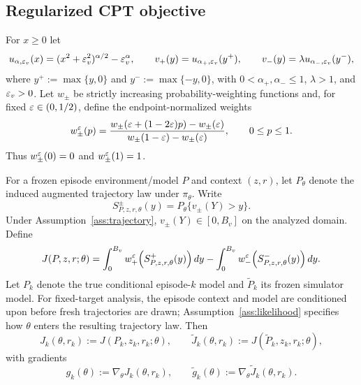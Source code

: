\subsection{Regularized CPT objective}

For $x\ge0$ let
\begin{equation}\label{eq:value-functions}
 u_{\alpha,\varepsilon_v}(x)=(x^2+\varepsilon_v^2)^{\alpha/2}-\varepsilon_v^\alpha,
 \qquad
 v_+(y)=u_{\alpha_+,\varepsilon_v}(y^+),
 \qquad
 v_-(y)=\lambda u_{\alpha_-,\varepsilon_v}(y^-),
\end{equation}
where $y^+:=\max\{y,0\}$ and $y^-:=\max\{-y,0\}$, with $0<\alpha_+,\alpha_-\le1$, $\lambda>1$, and $\varepsilon_v>0$.  Let $w_\pm$ be strictly increasing probability-weighting functions and, for fixed $\varepsilon\in(0,1/2)$, define the endpoint-normalized weights
\begin{equation}\label{eq:normalized-weight}
 w_\pm^\varepsilon(p)
 =\frac{w_\pm(\varepsilon+(1-2\varepsilon)p)-w_\pm(\varepsilon)}
 {w_\pm(1-\varepsilon)-w_\pm(\varepsilon)},
 \qquad 0\le p\le1.
\end{equation}
Thus $w_\pm^\varepsilon(0)=0$ and $w_\pm^\varepsilon(1)=1$.

For a frozen episode environment/model $P$ and context $(z,r)$, let $P_\theta$ denote the induced augmented trajectory law under $\pi_\theta$.  Write
\[
 S_{P,z,r,\theta}^{\pm}(y)
 =P_\theta\{v_\pm(Y)>y\}.
\]
Under Assumption~\ref{ass:trajectory}, $v_\pm(Y)\in[0,B_v]$ on the analyzed domain.  Define
\begin{equation}\label{eq:generic-cpt-objective}
 J(P,z,r;\theta)
 =\int_0^{B_v}w_+^\varepsilon\!\left(S_{P,z,r,\theta}^{+}(y)\right)dy
 -\int_0^{B_v}w_-^\varepsilon\!\left(S_{P,z,r,\theta}^{-}(y)\right)dy.
\end{equation}
Let $P_k$ denote the true conditional episode-$k$ model and $\widetilde P_k$ its frozen simulator model.  For fixed-target analysis, the episode context and model are conditioned upon before fresh trajectories are drawn; Assumption~\ref{ass:likelihood} specifies how $\theta$ enters the resulting trajectory law.  Then
\begin{equation}\label{eq:true-sim-objectives}
 J_k(\theta,r_k):=J(P_k,z_k,r_k;\theta),
 \qquad
 \widetilde J_k(\theta,r_k):=J(\widetilde P_k,z_k,r_k;\theta),
\end{equation}
with gradients
\begin{equation}\label{eq:true-sim-gradients}
 g_k(\theta):=\nabla_\theta J_k(\theta,r_k),
 \qquad
 \widetilde g_k(\theta):=\nabla_\theta\widetilde J_k(\theta,r_k).
\end{equation}

